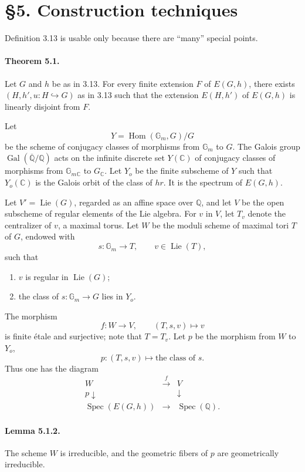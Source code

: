 \documentclass[10pt]{article}
\newcommand{\C}{\mathbb C}
\newcommand{\Gm}{\mathbb G_m}
\newcommand{\Q}{\mathbb Q}
\newcommand{\Hom}{\operatorname{Hom}}
\newcommand{\Lie}{\operatorname{Lie}}
\newcommand{\Gal}{\operatorname{Gal}}
\newcommand{\Spec}{\operatorname{Spec}}
\begin{document}
\section*{\S 5. Construction techniques}

Definition 3.13 is usable only because there are ``many'' special points.

\paragraph{Theorem 5.1.} Let $G$ and $h$ be as in 3.13. For every finite extension $F$ of $E(G,h)$, there exists $(H,h',u:H\hookrightarrow G)$ as in 3.13 such that the extension $E(H,h')$ of $E(G,h)$ is linearly disjoint from $F$.

Let
\[
Y=\Hom(\Gm,G)/G
\]
be the scheme of conjugacy classes of morphisms from $\Gm$ to $G$. The Galois group $\Gal(\overline{\Q}/\Q)$ acts on the infinite discrete set $Y(\C)$ of conjugacy classes of morphisms from $\Gm{}_{\C}$ to $G_{\C}$. Let $Y_o$ be the finite subscheme of $Y$ such that $Y_o(\C)$ is the Galois orbit of the class of $hr$. It is the spectrum of $E(G,h)$.

Let $V'=\Lie(G)$, regarded as an affine space over $\Q$, and let $V$ be the open subscheme of regular elements of the Lie algebra. For $v$ in $V$, let $T_v$ denote the centralizer of $v$, a maximal torus. Let $W$ be the moduli scheme of maximal tori $T$ of $G$, endowed with
\[
s:\Gm\longrightarrow T,\qquad v\in\Lie(T),
\]
such that
\begin{enumerate}[label=(\alph*)]
\item $v$ is regular in $\Lie(G)$;
\item the class of $s:\Gm\to G$ lies in $Y_o$.
\end{enumerate}
The morphism
\[
f:W\longrightarrow V,\qquad (T,s,v)\longmapsto v
\]
is finite étale and surjective; note that $T=T_v$. Let $p$ be the morphism from $W$ to $Y_o$,
\[
p:(T,s,v)\longmapsto \text{the class of }s.
\]
Thus one has the diagram
\[
\tag{5.1.1}
\begin{array}{ccc}
W & \xrightarrow{\ f\ } & V\\
{\scriptstyle p}\downarrow && \downarrow\\
\Spec(E(G,h)) & \longrightarrow & \Spec(\Q).
\end{array}
\]

\paragraph{Lemma 5.1.2.} The scheme $W$ is irreducible, and the geometric fibers of $p$ are geometrically irreducible.
\end{document}
